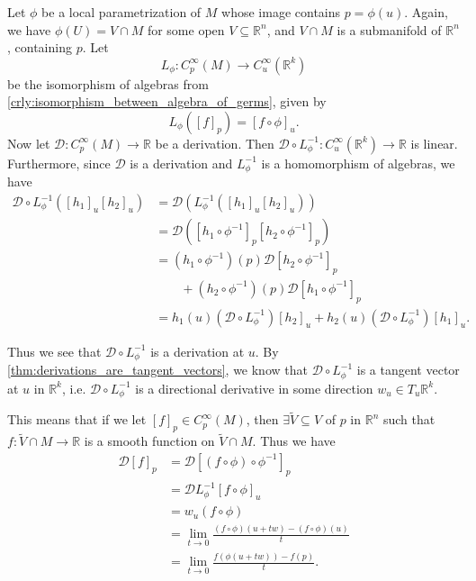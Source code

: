 \documentclass[notoc,notitlepage]{tufte-book}
\begin{document}
Let $\phi$ be a local parametrization of $M$ whose image contains $p = \phi(u)$.
Again, we have $\phi(U) = V \cap M$ for some open $V \subseteq \mathbb{R}^n$,
and $V \cap M$ is a submanifold of $\mathbb{R}^n$, containing $p$. Let
\begin{equation*}
  L_{\phi} : C_p^\infty(M) \to C_u^\infty(\mathbb{R}^k)
\end{equation*}
be the isomorphism of algebras from
\cref{crly:isomorphism_between_algebra_of_germs}, given by
\begin{equation*}
  L_{\phi}([f]_p) = [ f \circ \phi ]_u.
\end{equation*}
Now let $\mathcal{D} : C_p^\infty (M) \to \mathbb{R}$ be a derivation. Then
$\mathcal{D} \circ L_\phi^{-1} : C_u^\infty(\mathbb{R}^k) \to \mathbb{R}$ is
linear. Furthermore, since $\mathcal{D}$ is a derivation and $L_\phi^{-1}$ is a
homomorphism of algebras, we have
\begin{align*}
  \mathcal{D} \circ L_{\phi}^{-1} ([h_1]_u [h_2]_u)
  &= \mathcal{D}(L_{\phi}^{-1}([h_1]_u[h_2]_u)) \\
  &= \mathcal{D}([h_1 \circ \phi^{-1}]_p [h_2 \circ \phi^{-1}]_p) \\
  &= (h_1 \circ \phi^{-1})(p) \mathcal{D}[h_2 \circ \phi^{-1}]_p \\
  &\qquad + (h_2 \circ \phi^{-1})(p) \mathcal{D}[h_1 \circ \phi^{-1}]_p \\
  &= h_1(u) (\mathcal{D} \circ L_{\phi}^{-1})[h_2]_u
    + h_2(u) (\mathcal{D} \circ L_{\phi}^{-1})[h_1]_u.
\end{align*}

Thus we see that $\mathcal{D} \circ L_\phi^{-1}$ is a derivation at $u$.
By \cref{thm:derivations_are_tangent_vectors}, we know that $\mathcal{D} \circ
L_\phi^{-1}$ is a tangent vector at $u$ in $\mathbb{R}^k$, i.e. $\mathcal{D}
\circ L_{\phi}^{-1}$ is a directional derivative in some direction $w_u \in T_u
\mathbb{R}^k$.

This means that if we let $[f]_p \in C_p^\infty(M)$, then $\exists \tilde{V}
\subseteq V$ of $p$ in $\mathbb{R}^n$ such that $f : \tilde{V} \cap M \to
\mathbb{R}$ is a smooth function on $\tilde{V} \cap M$. Thus we have
\begin{align*}
  \mathcal{D}[f]_p
  &= \mathcal{D}[(f \circ \phi) \circ \phi^{-1}]_p \\
  &= \mathcal{D}L_{\phi}^{-1}[f \circ \phi]_u \\
  &= w_u (f \circ \phi) \\
  &= \lim_{t \to 0} \frac{(f \circ \phi)(u + tw) - (f \circ \phi)(u)}{t} \\
  &= \lim_{t \to 0} \frac{f(\phi(u + tw)) - f(p)}{t}.
\end{align*}
\end{document}
